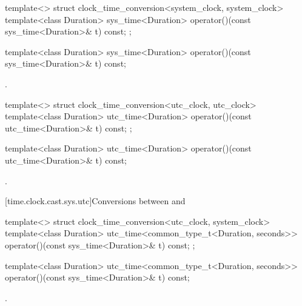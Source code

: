 \begin{codeblock}
template<>
struct clock_time_conversion<system_clock, system_clock> {
  template<class Duration>
    sys_time<Duration>
      operator()(const sys_time<Duration>& t) const;
};
\end{codeblock}

%
\begin{itemdecl}
template<class Duration>
  sys_time<Duration>
    operator()(const sys_time<Duration>& t) const;
\end{itemdecl}

\begin{itemdescr}
\pnum
\returns
{}.
\end{itemdescr}

\begin{codeblock}
template<>
struct clock_time_conversion<utc_clock, utc_clock> {
  template<class Duration>
    utc_time<Duration>
      operator()(const utc_time<Duration>& t) const;
};
\end{codeblock}

%
\begin{itemdecl}
template<class Duration>
  utc_time<Duration>
    operator()(const utc_time<Duration>& t) const;
\end{itemdecl}

\begin{itemdescr}
\pnum
\returns
{}.
\end{itemdescr}

[time.clock.cast.sys.utc]{Conversions between  and }

\begin{codeblock}
template<>
struct clock_time_conversion<utc_clock, system_clock> {
  template<class Duration>
    utc_time<common_type_t<Duration, seconds>>
      operator()(const sys_time<Duration>& t) const;
};
\end{codeblock}

%
\begin{itemdecl}
template<class Duration>
  utc_time<common_type_t<Duration, seconds>>
    operator()(const sys_time<Duration>& t) const;
\end{itemdecl}

\begin{itemdescr}
\pnum
\returns
{}.
\end{itemdescr}

